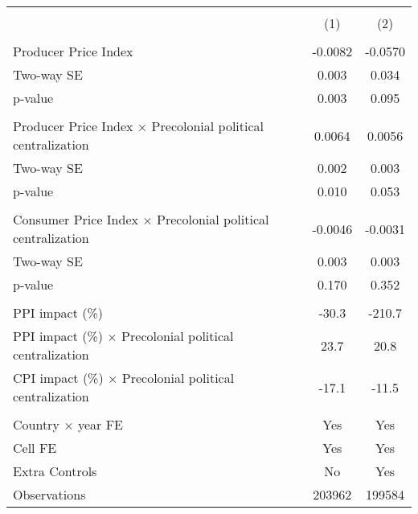 {
\def\sym#1{\ifmmode^{#1}\else\(^{#1}\)\fi}
\begin{tabular}{l*{2}{c}}
\hline\hline
                    &\\\cmidrule(lr){2-3}
                    &         &         \\
\hline
\hline
\\ Producer Price Index&     -0.0082         &     -0.0570         \\
\hspace{15pt} Two-way SE&       0.003         &       0.034         \\
\hspace{25pt} p-value&       0.003         &       0.095         \\
\\ Producer Price Index $\times$ Precolonial political centralization&      0.0064         &      0.0056         \\
\hspace{15pt} Two-way SE&       0.002         &       0.003         \\
\hspace{25pt} p-value&       0.010         &       0.053         \\
\\ Consumer Price Index $\times$ Precolonial political centralization&     -0.0046         &     -0.0031         \\
\hspace{15pt} Two-way SE&       0.003         &       0.003         \\
\hspace{25pt} p-value&       0.170         &       0.352         \\
\hline \\ PPI impact (\%)&       -30.3         &      -210.7         \\
PPI impact (\%) $\times$ Precolonial political centralization&        23.7         &        20.8         \\
CPI impact (\%) $\times$ Precolonial political centralization&       -17.1         &       -11.5         \\
\hline \\  Country $\times$ year FE&         Yes         &         Yes         \\
Cell FE             &         Yes         &         Yes         \\
Extra Controls      &          No         &         Yes         \\
Observations        &      203962         &      199584         \\
\hline\hline
\end{tabular}
}
